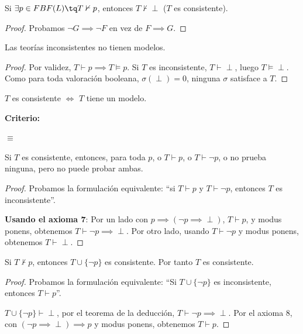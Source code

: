 \begin{theorem}
	Si $\exists p\in FBF(L) \tq T\nvdash p$, entonces $T\nvdash \perp$ ($T$ es consistente).
\end{theorem}
\begin{proof}
	Probamos $\neg G\implies \neg F$ en vez de $F\implies G$.
\end{proof}

\begin{corol}
	Las teorías inconsistentes no tienen modelos.
\end{corol}
\begin{proof}
	Por validez, $T\vdash p \implies T\vDash p$. Si $T$ es inconsistente, $T\vdash \perp$, luego $T\vDash\perp$. Como para toda valoración booleana, $\sigma(\perp) = 0$, ninguna $\sigma$ satisface a $T$.
\end{proof}

\begin{theorem}
	$T$ es consistente $\iff$ $T$ tiene un modelo.
\end{theorem}


\noindent\textbf{Criterio: }\mbox{}

	 $\equiv$


\begin{theorem}
	Si $T$ es consistente, entonces, para toda $p$, o $T\vdash p$, o $T\vdash \neg p$, o no prueba ninguna, pero no puede probar ambas.
\end{theorem}
\begin{proof}\mbox{}

	Probamos la formulación equivalente: ``si $T\vdash p$ y $T\vdash \neg p$, entonces $T$ es inconsistente''.

	\textbf{Usando el axioma 7}:
	Por un lado con $p\implies(\neg p \implies \perp)$, $T\vdash p$, y modus ponens, obtenemos $T\vdash \neg p \implies \perp$. Por otro lado, usando $T\vdash \neg p$ y modus ponens, obtenemos $T\vdash\perp$.
\end{proof}

\begin{theorem}
	Si $T \nvdash p$, entonces $T\cup \{\neg p\}$ es consistente. Por tanto $T$ es consistente.
\end{theorem}
\begin{proof}\mbox{}

	Probamos la formulación equivalente:  ``Si $T\cup \{\neg p\}$ es inconsistente, entonces $T\vdash p$''.

	$T\cup \{\neg p\}\vdash \perp$, por el teorema de la deducción, $T\vdash \neg p\implies \perp$. Por el axioma 8, con $(\neg p \implies \perp)\implies p$ y modus ponens, obtenemos $T\vdash p$.
\end{proof}

